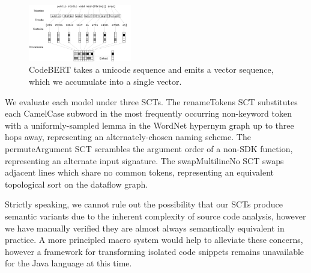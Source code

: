 \documentclass[sigconf,review,anonymous]{acmart}
\begin{document}
  \begin{figure}[H]
    \centering
    \includegraphics[width=0.40\textwidth]{figs/bert_embedding}
    \caption{CodeBERT takes a unicode sequence and emits a vector sequence, which we accumulate into a single vector.}
    \label{fig:bert}
  \end{figure}

  We evaluate each model under three SCTs. The renameTokens SCT substitutes each CamelCase subword in the most frequently occurring non-keyword token with a uniformly-sampled lemma in the WordNet hypernym graph up to three hops away, representing an alternately-chosen naming scheme. The permuteArgument SCT scrambles the argument order of a non-SDK function, representing an alternate input signature. The swapMultilineNo SCT swaps adjacent lines which share no common tokens, representing an equivalent topological sort on the dataflow graph.

  Strictly speaking, we cannot rule out the possibility that our SCTs produce semantic variants due to the inherent complexity of source code analysis, however we have manually verified they are almost always semantically equivalent in practice. A more principled macro system would help to alleviate these concerns, however a framework for transforming isolated code snippets remains unavailable for the Java language at this time.
\end{document}
